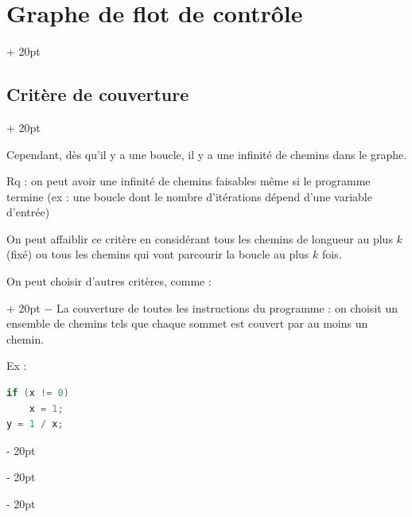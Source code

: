 \documentclass[a4paper, 12pt, twoside]{article}
\newcommand{\ind}[1][20pt]{\advance\leftskip + #1}
\newcommand{\deind}[1][20pt]{\advance\leftskip - #1}
\newenvironment{indentedenv}[1][20pt]{\par \ind[#1]}{\par \deind}
\newenvironment{indt}[2][20pt]{#2 \begin{indentedenv}[#1]}{\end{indentedenv}} %
\begin{document}
\begin{indt}{\section{Graphe de flot de contrôle}}
\begin{indt}{\subsection{Critère de couverture}}
            
            \vspace{6pt}
            
            Cependant, dès qu'il y a une boucle, il y a une infinité de chemins dans le graphe.
            
            Rq : on peut avoir une infinité de chemins faisables même si le programme termine (ex : une boucle dont le nombre d'itérations dépend d'une variable d'entrée)
            
            On peut affaiblir ce critère en considérant tous les chemins de longueur au plus $k$ (fixé) ou tous les chemins qui vont parcourir la boucle au plus $k$ fois.
            
            \vspace{12pt}
            
            \begin{indt}{On peut choisir d'autres critères, comme :}
                $-$ La couverture de toutes les instructions du programme : on choisit un ensemble de chemins tels que chaque sommet est couvert par au moins un chemin.
                
                Ex :
                \begin{lstlisting}[language=C, xleftmargin=80pt]
if (x != 0)
    x = 1;
y = 1 / x;\end{lstlisting}
                

\end{indt}
\end{indt}
\end{indt}
\end{document}
